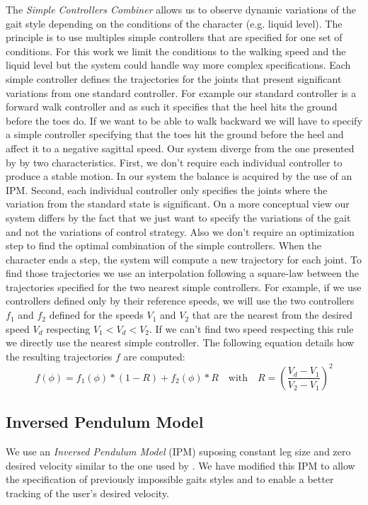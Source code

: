 \documentclass[conference]{acmsiggraph}
\begin{document}
The \textit{Simple Controllers Combiner} allows us to observe dynamic variations of the gait style depending on the conditions of the character (e.g. liquid level). The principle is to use multiples simple controllers that are specified for one set of conditions. For this work we limit the conditions to the walking speed and the liquid level but the system could handle way more complex specifications. Each simple controller defines the trajectories for the joints that present significant variations from one standard controller. For example our standard controller is a forward walk controller and as such it specifies that the heel hits the ground before the toes do. If we want to be able to walk backward we will have to specify a simple controller specifying that the toes hit the ground before the heel and affect it to a negative sagittal speed. Our system diverge from the one presented by \cite{coros2009robust} by two characteristics. First, we don't require each individual controller to produce a stable motion. In our system the balance is acquired by the use of an IPM. Second, each individual controller only specifies the joints where the variation from the standard state is significant. On a more conceptual view our system differs by the fact that we just want to specify the variations of the gait and not the variations of control strategy. Also we don't require an optimization step to find the optimal combination of the simple controllers. When the character ends a step, the system will compute a new trajectory for each joint. To find those trajectories we use an interpolation following a square-law between the trajectories specified for the two nearest simple controllers. For example, if we use controllers defined only by their reference speeds, we will use the two controllers $f_1$ and $f_2$ defined for the speeds $V_1$ and $V_2$ that are the nearest from the desired speed $V_d$ respecting $V_1 < V_d < V_2$. If we can't find two speed respecting this rule we directly use the nearest simple controller. The following equation details how the resulting trajectories $f$ are computed:
$$
f(\phi)=f_1(\phi)*(1-R)+f_2(\phi)*R   \quad \textrm{with} \quad   R=(\frac{V_d-V_1}{V_2-V_1})^2
$$

\subsection{Inversed Pendulum Model}
\label{sec:IPM}

We use an \textit{Inversed Pendulum Model} (IPM) suposing constant leg size and zero desired velocity similar to the one used by \cite{coros2010generalized}. We have modified this IPM to allow the specification of previously impossible gaits styles and to enable a better tracking of the user's desired velocity. 
\end{document}

